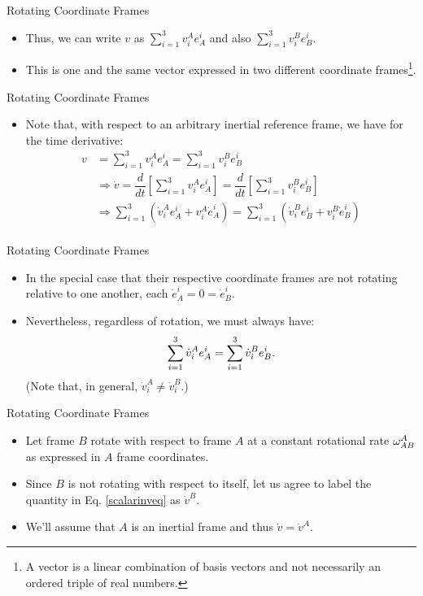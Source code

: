 \begin{frame}
Rotating Coordinate Frames
\begin{itemize}
\item Thus, we can write
$v$ as $\sum_{i=1}^3 v_i^A e_A^i$ and also $\sum_{i=1}^3 v_i^B
e_B^i$. 
\item This is one and the same vector expressed in two different
coordinate frames\footnote{A vector is a linear combination of
basis vectors and not necessarily an ordered triple of real numbers.}.
\end{itemize}
\end{frame}
\begin{frame}
Rotating Coordinate Frames
\begin{itemize}
\item Note that, with respect to an arbitrary inertial
reference frame, we have for the time derivative:
\begin{align*}
  v &= \sum_{i=1}^3 v_i^A e_A^i = \sum_{i=1}^3 v_i^B e_B^i\\
    &\Rightarrow  \dot{v} = \dfrac{d}{dt}\left[ \sum_{i=1}^3 v_i^A e_A^i \right] = \dfrac{d}{dt}\left[\sum_{i=1}^3 v_i^B e_B^i
    \right]\\
    &\Rightarrow \sum_{i=1}^3 \left( \dot{v}_i^A e_A^i+ v_i^A
    \dot{e}_A^i\right)
    = \sum_{i=1}^3 \left(\dot{v}_i^B e_B^i+ v_i^B \dot{e}_B^i\right)\\
\end{align*}
\end{itemize}
\end{frame}
\begin{frame}
Rotating Coordinate Frames
\begin{itemize}
\item In the special case
that their respective coordinate frames are not rotating relative
to one another, each $\dot{e}_A^i = 0 = \dot{e}_B^i$.   
\item Nevertheless, regardless of rotation, we must always have:
\begin{equation}\label{scalarinveq}
  \sum_{i=1}^3 \dot{v}_i^A e_A^i=\sum_{i=1}^3 \dot{v}_i^B e_B^i.
\end{equation}
(Note that, in general, $\dot{v}_i^A\neq\dot{v}_i^B$.)
\end{itemize}
\end{frame}
\begin{frame}
Rotating Coordinate Frames
\begin{itemize}
\item Let frame $B$ rotate with respect to frame $A$ at a constant
rotational rate $\omega_{AB}^A$ as expressed in $A$ frame coordinates.  
\item Since $B$ is not rotating with respect to itself, let us agree to label the quantity in Eq. \eqref{scalarinveq} as
$\dot{v}^B$. 
\item We'll assume that $A$ is an inertial frame and thus $\dot{v}=\dot{v}^A$.
\end{itemize}
\end{frame}
